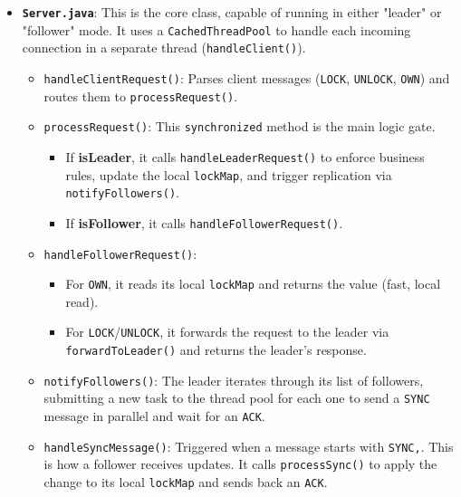 \documentclass[a4paper,11pt]{article}
\begin{document}
\begin{itemize}
    \item \textbf{\texttt{Server.java}}: This is the core class, capable of running in either "leader" or "follower" mode. It uses a \texttt{CachedThreadPool} to handle each incoming connection in a separate thread (\texttt{handleClient()}).
        \begin{itemize}
            \item \texttt{handleClientRequest()}: Parses client messages (\texttt{LOCK}, \texttt{UNLOCK}, \texttt{OWN}) and routes them to \texttt{processRequest()}.
            \item \texttt{processRequest()}: This \texttt{synchronized} method is the main logic gate.
                \begin{itemize}
                    \item If \textbf{isLeader}, it calls \texttt{handleLeaderRequest()} to enforce business rules, update the local \texttt{lockMap}, and trigger replication via \texttt{notifyFollowers()}.
                    \item If \textbf{isFollower}, it calls \texttt{handleFollowerRequest()}.
                \end{itemize}
            \item \texttt{handleFollowerRequest()}:
                \begin{itemize}
                    \item For \texttt{OWN}, it reads its local \texttt{lockMap} and returns the value (fast, local read).
                    \item For \texttt{LOCK}/\texttt{UNLOCK}, it forwards the request to the leader via \texttt{forwardToLeader()} and returns the leader's response.
                \end{itemize}
            \item \texttt{notifyFollowers()}: The leader iterates through its list of followers, submitting a new task to the thread pool for each one to send a \texttt{SYNC} message in parallel and wait for an \texttt{ACK}.
            \item \texttt{handleSyncMessage()}: Triggered when a message starts with \texttt{SYNC,}. This is how a follower receives updates. It calls \texttt{processSync()} to apply the change to its local \texttt{lockMap} and sends back an \texttt{ACK}.
        \end{itemize}
\end{itemize}
\end{document}
